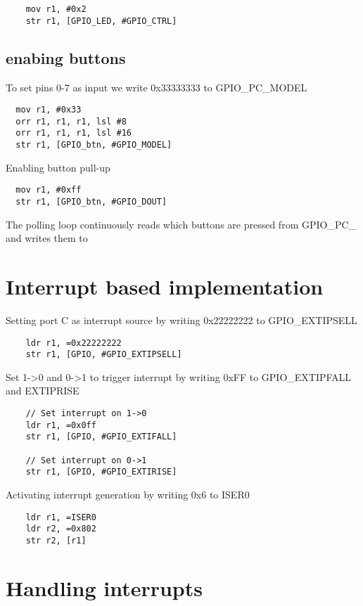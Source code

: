 \begin{lstlisting}
	mov r1, #0x2
	str r1, [GPIO_LED, #GPIO_CTRL]
\end{lstlisting}

\subsection{enabing buttons}

To set pins 0-7 as input we write 0x33333333 to GPIO\_PC\_MODEL

\begin{lstlisting}
  mov r1, #0x33
  orr r1, r1, r1, lsl #8
  orr r1, r1, r1, lsl #16
  str r1, [GPIO_btn, #GPIO_MODEL]
\end{lstlisting}

Enabling button pull-up

\begin{lstlisting}
  mov r1, #0xff
  str r1, [GPIO_btn, #GPIO_DOUT]
\end{lstlisting}

The polling loop continuously reads which buttons are pressed from GPIO\_PC\_ and writes them to 

\section{Interrupt based implementation}

Setting port C as interrupt source by writing 0x22222222 to GPIO\_EXTIPSELL

\begin{lstlisting}
	ldr r1, =0x22222222
	str r1, [GPIO, #GPIO_EXTIPSELL]
\end{lstlisting}

Set 1->0 and 0->1 to trigger interrupt by writing 0xFF to GPIO\_EXTIPFALL and EXTIPRISE

\begin{lstlisting}
	// Set interrupt on 1->0
	ldr r1, =0x0ff
	str r1, [GPIO, #GPIO_EXTIFALL]

	// Set interrupt on 0->1
	str r1, [GPIO, #GPIO_EXTIRISE]
\end{lstlisting}

Activating interrupt generation by writing 0x6 to ISER0

\begin{lstlisting}
	ldr r1, =ISER0
	ldr r2, =0x802
	str r2, [r1]
\end{lstlisting}

\section{Handling interrupts}


